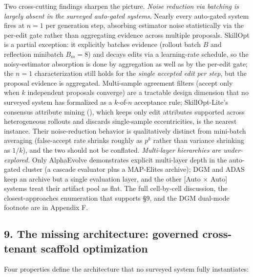 \documentclass[
]{article}
\begin{document}
Two cross-cutting findings sharpen the picture. \emph{Noise reduction
via batching is largely absent in the surveyed auto-gated systems}.
Nearly every auto-gated system fires at \(n = 1\) per generation step,
absorbing estimator noise statistically via the per-edit gate rather
than aggregating evidence across multiple proposals. SkillOpt is a
partial exception: it explicitly batches evidence (rollout batch \(B\)
and reflection minibatch \(B_m{=}8\)) and decays edits via a
learning-rate schedule, so the noisy-estimator absorption is done by
aggregation as well as by the per-edit gate; the \(n{=}1\)
characterization still holds for the \emph{single accepted edit per
step}, but the proposal evidence is aggregated. Multi-sample agreement
filters (accept only when \(k\) independent proposals converge) are a
tractable design dimension that no surveyed system has formalized as a
\(k\)-of-\(n\) acceptance rule; SkillOpt-Lite's consensus attribute
mining (), which
keeps only edit attributes supported across heterogeneous rollouts and
discards single-sample eccentricities, is the nearest instance. Their
noise-reduction behavior is qualitatively distinct from mini-batch
averaging (false-accept rate shrinks roughly as \(p^k\) rather than
variance shrinking as \(1/k\)), and the two should not be conflated.
\emph{Multi-layer hierarchies are under-explored.} Only AlphaEvolve
demonstrates explicit multi-layer depth in the auto-gated cluster (a
cascade evaluator plus a MAP-Elites archive); DGM and ADAS keep an
archive but a single evaluation layer, and the other {[}Auto × Auto{]}
systems treat their artifact pool as flat. The full cell-by-cell
discussion, the closest-approaches enumeration that supports §9, and the
DGM dual-mode footnote are in Appendix F.

\subsection{9. The missing architecture: governed cross-tenant scaffold
optimization}\label{the-missing-architecture-governed-cross-tenant-scaffold-optimization}

Four properties define the architecture that no surveyed system fully
instantiates:
\end{document}
